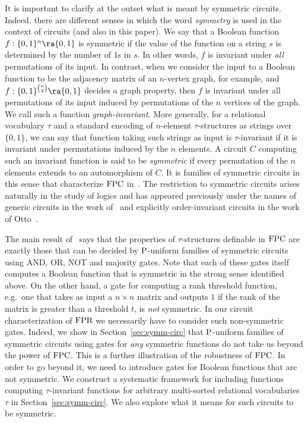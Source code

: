 \documentclass[../paper.tex]{subfiles}
\begin{document}
It is important to clarify at the outset what is meant by symmetric
circuits.  Indeed, there are different senses in which the word
\emph{symmetry} is used in the context of circuits (and also in this
paper).  We say that a Boolean function $f:\{0,1\}^n \ra \{0,1\}$ is
symmetric if the value of the function on a string $s$ is determined
by the number of $1$s in $s$.  In other words, $f$ is invariant under
\emph{all} permutations of its input.  In contrast, when we consider
the input to a Boolean function to be the adjacency matrix of an
$n$-vertex graph, for example, and
$f : \{0,1\}^{n \choose 2} \ra \{0,1\}$ decides a graph property, then
$f$ is invariant under all permutations of its input induced by
permutations of the $n$ vertices of the graph.  We call such a
function \emph{graph-invariant}.  More generally, for a relational
vocabulary $\tau$ and a standard encoding of $n$-element
$\tau$-structures as strings over $\{0,1\}$, we can say that function
taking such strings as input is $\tau$-invariant if it is invariant
under permutations induced by the $n$ elements.
A circuit $C$ computing such an invariant function is said to be \emph{symmetric} if every
permutation of the $n$ elements extends to an automorphism of $C$.  It
is families of symmetric circuits in this sense that characterize
$\text{\upshape FPC}$ in~\cite{AndersonD17}.  The restriction to symmetric circuits
arises naturally in the study of logics and has appeared previously
under the names of generic circuits in the work
of~\cite{DENENBERG1986216} and explicitly order-invariant circuits in
the work of Otto~\cite{Otto1997}.  

The main result of~\cite{AndersonD17} says that the properties of
$\tau$-structures definable in $\text{\upshape FPC}$ are exactly those that can be
decided by $\mathrm{P}$-uniform families of symmetric circuits using AND, OR,
NOT and majority gates.  Note that each of these gates itself computes
a Boolean function that is symmetric in the strong sense identified
above.  On the other hand, a gate for computing a rank threshold
function, e.g.\ one that takes as input a $n \times n$ matrix and
outputs $1$ if the rank of the matrix is greater than a threshold $t$,
is \emph{not} symmetric.  In our circuit characterization of $\text{\upshape FPR}$ we
necessarily have to consider such non-symmetric gates.  Indeed, we
show in Section~\ref{sec:symm-circ} that  $\mathrm{P}$-uniform families of
symmetric circuits using gates for \emph{any} symmetric functions do
not take us beyond the power of $\text{\upshape FPC}$.  This is a further
illustration of the robustness of $\text{\upshape FPC}$.  In order to go beyond it,
we need to introduce gates for Boolean functions that are not
symmetric.  We construct a systematic framework for including
functions computing $\tau$-invariant functions for arbitrary
multi-sorted relational vocabularies $\tau$ in
Section~\ref{sec:symm-circ}.  We also explore what it means for such
circuits to be symmetric.
\end{document}
